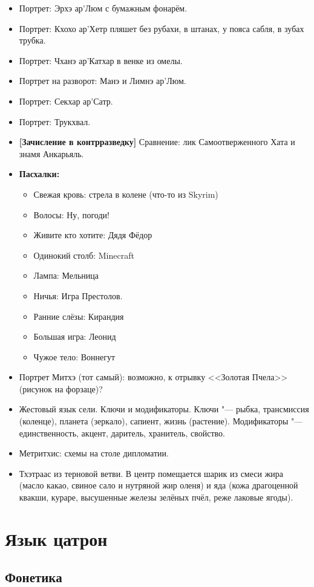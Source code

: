 \begin{itemize}
\item Портрет: Эрхэ ар'Люм с бумажным фонарём.
\item Портрет: Кхохо ар'Хетр пляшет без рубахи, в штанах, у пояса сабля, в зубах трубка.
\item Портрет: Чханэ ар'Катхар в венке из омелы.
\item Портрет на разворот: Манэ и Лимнэ ар'Люм.
\item Портрет: Секхар ар'Сатр.
\item Портрет: Трукхвал.
\item \textbf{[Зачисление в контрразведку]} Сравнение: лик Самоотверженного Хата и знамя Анкарьяль.
\item \textbf{Пасхалки:}
\begin{itemize}
\item Свежая кровь: стрела в колене (что-то из Skyrim)
\item Волосы: Ну, погоди!
\item Живите кто хотите: Дядя Фёдор
\item Одинокий столб: Minecraft
\item Лампа: Мельница
\item Ничья: Игра Престолов.
\item Ранние слёзы: Кирандия
\item Большая игра: Леонид
\item Чужое тело: Воннегут
\end{itemize}
\item Портрет Митхэ (тот самый): возможно, к отрывку <<Золотая Пчела>> (рисунок на форзаце)?
\item Жестовый язык сели.
Ключи и модификаторы.
Ключи "--- рыбка, трансмиссия (коленце), планета (зеркало), сапиент, жизнь (растение).
Модификаторы "--- единственность, акцент, даритель, хранитель, свойство.
\item Метритхис: схемы на столе дипломатии.
\item Тхэтраас из терновой ветви. 
В центр помещается шарик из смеси жира (масло какао, свиное сало и нутряной жир оленя) и яда (кожа драгоценной квакши, кураре, высушенные железы зелёных пчёл, реже лаковые ягоды).
\end{itemize}

\section{Язык цатрон}

\subsection{Фонетика}

